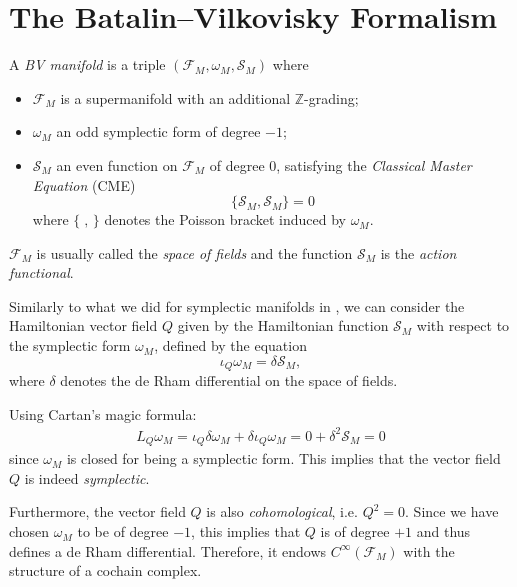 \section{The Batalin–Vilkovisky Formalism}
\label{sec:BV_formalism}

\begin{definition}
\label{def:BV_manifold}
    A \emph{BV manifold} is a triple $(\mathcal{F}_M, \omega_M, \mathcal{S}_M)$ where
    \begin{itemize}
        \item $\mathcal{F}_M$ is a supermanifold with an additional $\mathbb{Z}$-grading;
        \item $\omega_M$ an odd symplectic form of degree $-1$;
        \item $\mathcal{S}_M$ an even function on $\mathcal{F}_M$ of degree $0$, satisfying the \emph{Classical Master Equation} (CME)
        \begin{equation}
            \{\mathcal{S}_M, \mathcal{S}_M\} = 0
        \end{equation}
        where $\{\;,\,\}$ denotes the Poisson bracket induced by $\omega_M$.
    \end{itemize}
\end{definition}

$\mathcal{F}_M$ is usually called the \emph{space of fields} and the function $\mathcal{S}_M$ is the \emph{action functional}.

Similarly to what we did for symplectic manifolds in , we can consider the Hamiltonian vector field $Q$ given by the Hamiltonian function $\mathcal{S}_M$ with respect to the symplectic form $\omega_M$, defined by the equation
\begin{equation*}
    \iota_Q \omega_M = \delta \mathcal{S}_M,
\end{equation*}
where $\delta$ denotes the de Rham differential on the space of fields.

Using Cartan's magic formula:
\begin{align*}
    L_Q \omega_M = \iota_Q \delta \omega_M + \delta \iota_Q \omega_M =
    0 + \delta^2 \mathcal{S}_M = 0
\end{align*}
since $\omega_M$ is closed for being a symplectic form.
This implies that the vector field $Q$ is indeed \emph{symplectic}.

Furthermore, the vector field $Q$ is also \emph{cohomological}, i.e. $Q^2 = 0$.
Since we have chosen $\omega_M$ to be of degree $-1$, this implies that $Q$ is of degree $+1$ and thus defines a de Rham differential.
Therefore, it endows $C^\infty(\mathcal{F}_M)$ with the structure of a cochain complex.

